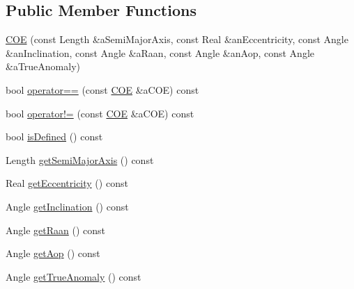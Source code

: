 \subsection*{Public Member Functions}
\begin{DoxyCompactItemize}
\item 
\hyperlink{classlibrary_1_1astro_1_1trajectory_1_1orbit_1_1models_1_1kepler_1_1_c_o_e_a5b1b2b906073bd8179dbe829e2313ade}{C\+OE} (const Length \&a\+Semi\+Major\+Axis, const Real \&an\+Eccentricity, const Angle \&an\+Inclination, const Angle \&a\+Raan, const Angle \&an\+Aop, const Angle \&a\+True\+Anomaly)
\item 
bool \hyperlink{classlibrary_1_1astro_1_1trajectory_1_1orbit_1_1models_1_1kepler_1_1_c_o_e_ac9143f26120f363581c66f757f184bd9}{operator==} (const \hyperlink{classlibrary_1_1astro_1_1trajectory_1_1orbit_1_1models_1_1kepler_1_1_c_o_e}{C\+OE} \&a\+C\+OE) const
\item 
bool \hyperlink{classlibrary_1_1astro_1_1trajectory_1_1orbit_1_1models_1_1kepler_1_1_c_o_e_a7bc070928ce3c19ce8592f0c97dc409d}{operator!=} (const \hyperlink{classlibrary_1_1astro_1_1trajectory_1_1orbit_1_1models_1_1kepler_1_1_c_o_e}{C\+OE} \&a\+C\+OE) const
\item 
bool \hyperlink{classlibrary_1_1astro_1_1trajectory_1_1orbit_1_1models_1_1kepler_1_1_c_o_e_acce2662621d60f29d145ed73d32d9ef3}{is\+Defined} () const
\item 
Length \hyperlink{classlibrary_1_1astro_1_1trajectory_1_1orbit_1_1models_1_1kepler_1_1_c_o_e_aaa204b1c157b10dec7cef4d1096344d7}{get\+Semi\+Major\+Axis} () const
\item 
Real \hyperlink{classlibrary_1_1astro_1_1trajectory_1_1orbit_1_1models_1_1kepler_1_1_c_o_e_a31e88a22bbc8bbed4740fe0dc22122cd}{get\+Eccentricity} () const
\item 
Angle \hyperlink{classlibrary_1_1astro_1_1trajectory_1_1orbit_1_1models_1_1kepler_1_1_c_o_e_ada07ed34dd893241c8199d2d38dffe41}{get\+Inclination} () const
\item 
Angle \hyperlink{classlibrary_1_1astro_1_1trajectory_1_1orbit_1_1models_1_1kepler_1_1_c_o_e_af3087116161d9ab3ee585261e47dfde1}{get\+Raan} () const
\item 
Angle \hyperlink{classlibrary_1_1astro_1_1trajectory_1_1orbit_1_1models_1_1kepler_1_1_c_o_e_ab7c87f1c0304e17731ee339c8a5308fc}{get\+Aop} () const
\item 
Angle \hyperlink{classlibrary_1_1astro_1_1trajectory_1_1orbit_1_1models_1_1kepler_1_1_c_o_e_a02860869d6fe124102975365ec36bfc6}{get\+True\+Anomaly} () const

\end{DoxyCompactItemize}
